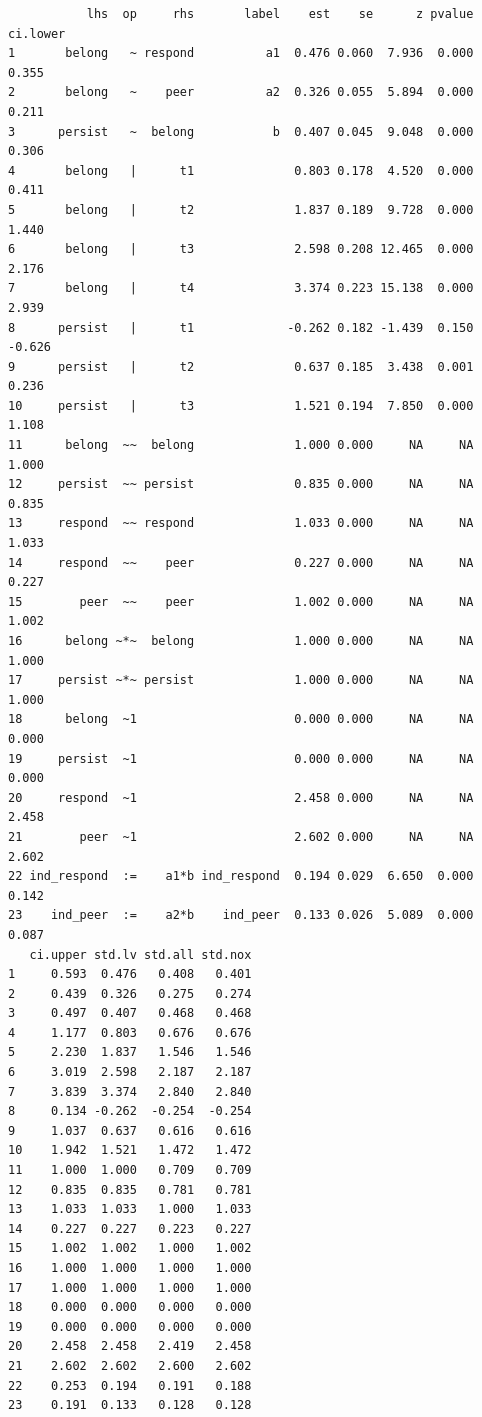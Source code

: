 \documentclass[
  letterpaper,
  DIV=11,
  numbers=noendperiod]{scrartcl}
\begin{document}
\begin{verbatim}
           lhs  op     rhs       label    est    se      z pvalue ci.lower
1       belong   ~ respond          a1  0.476 0.060  7.936  0.000    0.355
2       belong   ~    peer          a2  0.326 0.055  5.894  0.000    0.211
3      persist   ~  belong           b  0.407 0.045  9.048  0.000    0.306
4       belong   |      t1              0.803 0.178  4.520  0.000    0.411
5       belong   |      t2              1.837 0.189  9.728  0.000    1.440
6       belong   |      t3              2.598 0.208 12.465  0.000    2.176
7       belong   |      t4              3.374 0.223 15.138  0.000    2.939
8      persist   |      t1             -0.262 0.182 -1.439  0.150   -0.626
9      persist   |      t2              0.637 0.185  3.438  0.001    0.236
10     persist   |      t3              1.521 0.194  7.850  0.000    1.108
11      belong  ~~  belong              1.000 0.000     NA     NA    1.000
12     persist  ~~ persist              0.835 0.000     NA     NA    0.835
13     respond  ~~ respond              1.033 0.000     NA     NA    1.033
14     respond  ~~    peer              0.227 0.000     NA     NA    0.227
15        peer  ~~    peer              1.002 0.000     NA     NA    1.002
16      belong ~*~  belong              1.000 0.000     NA     NA    1.000
17     persist ~*~ persist              1.000 0.000     NA     NA    1.000
18      belong  ~1                      0.000 0.000     NA     NA    0.000
19     persist  ~1                      0.000 0.000     NA     NA    0.000
20     respond  ~1                      2.458 0.000     NA     NA    2.458
21        peer  ~1                      2.602 0.000     NA     NA    2.602
22 ind_respond  :=    a1*b ind_respond  0.194 0.029  6.650  0.000    0.142
23    ind_peer  :=    a2*b    ind_peer  0.133 0.026  5.089  0.000    0.087
   ci.upper std.lv std.all std.nox
1     0.593  0.476   0.408   0.401
2     0.439  0.326   0.275   0.274
3     0.497  0.407   0.468   0.468
4     1.177  0.803   0.676   0.676
5     2.230  1.837   1.546   1.546
6     3.019  2.598   2.187   2.187
7     3.839  3.374   2.840   2.840
8     0.134 -0.262  -0.254  -0.254
9     1.037  0.637   0.616   0.616
10    1.942  1.521   1.472   1.472
11    1.000  1.000   0.709   0.709
12    0.835  0.835   0.781   0.781
13    1.033  1.033   1.000   1.033
14    0.227  0.227   0.223   0.227
15    1.002  1.002   1.000   1.002
16    1.000  1.000   1.000   1.000
17    1.000  1.000   1.000   1.000
18    0.000  0.000   0.000   0.000
19    0.000  0.000   0.000   0.000
20    2.458  2.458   2.419   2.458
21    2.602  2.602   2.600   2.602
22    0.253  0.194   0.191   0.188
23    0.191  0.133   0.128   0.128
\end{verbatim}
\end{document}
